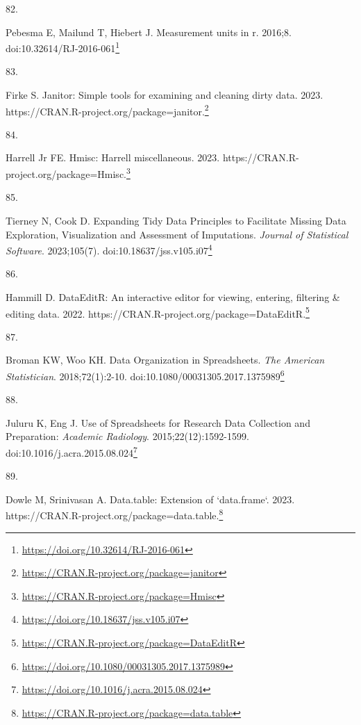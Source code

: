 \documentclass[
  a4paper,
]{book}
\newlength{\cslhangindent}
\newlength{\csllabelwidth}
\newlength{\cslentryspacingunit} %
\newenvironment{CSLReferences}[2] %
 {%
  \setlength{\parindent}{0pt}
  \ifodd #1
  \let\oldpar\par
  \def\par{\hangindent=\cslhangindent\oldpar}
  \fi
  \setlength{\parskip}{#2\cslentryspacingunit}
 }%
 {}
\newcommand{\CSLLeftMargin}[1]{\parbox[t]{\csllabelwidth}{#1}}
\newcommand{\CSLRightInline}[1]{\parbox[t]{\linewidth - \csllabelwidth}{#1}\break}
\renewcommand{\href}[2]{#2\footnote{\url{#1}}}
\begin{document}
\begin{CSLReferences}{0}{0}
\leavevmode{}%
\CSLLeftMargin{82. }%
\CSLRightInline{Pebesma E, Mailund T, Hiebert J. Measurement units in {\textbraceleft}r{\textbraceright}. 2016;8. doi:\href{https://doi.org/10.32614/RJ-2016-061}{10.32614/RJ-2016-061}}

\leavevmode{}%
\CSLLeftMargin{83. }%
\CSLRightInline{Firke S. Janitor: Simple tools for examining and cleaning dirty data. 2023. \href{https://CRAN.R-project.org/package=janitor}{https://CRAN.R-project.org/package=janitor.}}

\leavevmode{}%
\CSLLeftMargin{84. }%
\CSLRightInline{Harrell Jr FE. Hmisc: Harrell miscellaneous. 2023. \href{https://CRAN.R-project.org/package=Hmisc}{https://CRAN.R-project.org/package=Hmisc.}}

\leavevmode{}%
\CSLLeftMargin{85. }%
\CSLRightInline{Tierney N, Cook D. Expanding Tidy Data Principles to Facilitate Missing Data Exploration, Visualization and Assessment of Imputations. \emph{Journal of Statistical Software}. 2023;105(7). doi:\href{https://doi.org/10.18637/jss.v105.i07}{10.18637/jss.v105.i07}}

\leavevmode{}%
\CSLLeftMargin{86. }%
\CSLRightInline{Hammill D. DataEditR: An interactive editor for viewing, entering, filtering \& editing data. 2022. \href{https://CRAN.R-project.org/package=DataEditR}{https://CRAN.R-project.org/package=DataEditR.}}

\leavevmode{}%
\CSLLeftMargin{87. }%
\CSLRightInline{Broman KW, Woo KH. Data Organization in Spreadsheets. \emph{The American Statistician}. 2018;72(1):2-10. doi:\href{https://doi.org/10.1080/00031305.2017.1375989}{10.1080/00031305.2017.1375989}}

\leavevmode{}%
\CSLLeftMargin{88. }%
\CSLRightInline{Juluru K, Eng J. Use of Spreadsheets for Research Data Collection and Preparation: \emph{Academic Radiology}. 2015;22(12):1592-1599. doi:\href{https://doi.org/10.1016/j.acra.2015.08.024}{10.1016/j.acra.2015.08.024}}

\leavevmode{}%
\CSLLeftMargin{89. }%
\CSLRightInline{Dowle M, Srinivasan A. Data.table: Extension of `data.frame`. 2023. \href{https://CRAN.R-project.org/package=data.table}{https://CRAN.R-project.org/package=data.table.}}


\end{CSLReferences}
\end{document}
